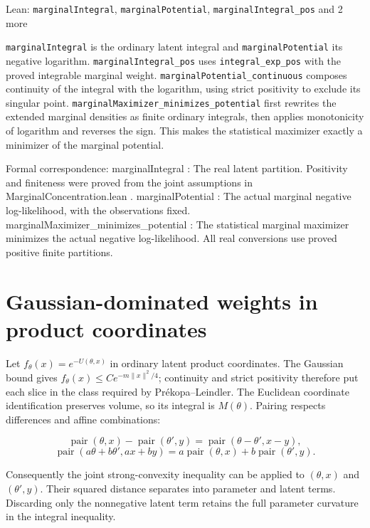 \documentclass[11pt,a4paper]{article}
\newlength{\leancharwidth}
\newenvironment{leancode}{\par\smallskip\begingroup\ttfamily\footnotesize\raggedright
  \settowidth{\leancharwidth}{M}\setlength{\parskip}{0pt}\setlength{\parindent}{0pt}
  \frenchspacing}{\par\endgroup\smallskip}
\newcommand{\leanlabel}[1]{\par\smallskip\noindent{\small\bfseries #1}\par}
\begin{document}
\begin{leanbox}{Lean: \texttt{marginalIntegral}, \texttt{marginalPotential}, \texttt{marginalIntegral\_\allowbreak{}pos} and 2 more}
\begin{leancode}
\end{leancode}
\leanlabel{How the Lean proof follows the argument}
\texttt{marginal\allowbreak{}Integral} is the ordinary latent integral and \texttt{marginal\allowbreak{}Potential} its negative logarithm. \texttt{marginal\allowbreak{}Integral\_\allowbreak{}pos} uses \texttt{integral\_\allowbreak{}exp\_\allowbreak{}pos} with the proved integrable marginal weight. \texttt{marginal\allowbreak{}Potential\_\allowbreak{}continuous} composes continuity of the integral with the logarithm, using strict positivity to exclude its singular point. \texttt{marginal\allowbreak{}Maximizer\_\allowbreak{}minimizes\_\allowbreak{}potential} first rewrites the extended marginal densities as finite ordinary integrals, then applies monotonicity of logarithm and reverses the sign. This makes the statistical maximizer exactly a minimizer of the marginal potential.



Formal correspondence: marginalIntegral : The real latent partition. Positivity and finiteness were proved from the joint assumptions in MarginalConcentration.lean . marginalPotential : The actual marginal negative log-likelihood, with the observations fixed. marginalMaximizer\_minimizes\_potential : The statistical marginal maximizer minimizes the actual negative log-likelihood. All real conversions use proved positive finite partitions.
\end{leanbox}

\section{\texorpdfstring{Gaussian-dominated weights in product coordinates}{Gaussian-dominated weights in product coordinates}}


Let \(f_\theta(x)=e^{-U(\theta,x)}\) in ordinary latent product coordinates. The Gaussian bound gives \(f_\theta(x)\le Ce^{-m\|x\|^2/4}\); continuity and strict positivity therefore put each slice in the class required by Prékopa–Leindler. The Euclidean coordinate identification preserves volume, so its integral is \(M(\theta)\). Pairing respects differences and affine combinations:

\[\operatorname{pair}(\theta,x)-\operatorname{pair}(\theta',y)=\operatorname{pair}(\theta-\theta',x-y),\]\[\operatorname{pair}(a\theta+b\theta',ax+by)=a\operatorname{pair}(\theta,x)+b\operatorname{pair}(\theta',y).\]

Consequently the joint strong-convexity inequality can be applied to \((\theta,x)\) and \((\theta',y)\). Their squared distance separates into parameter and latent terms. Discarding only the nonnegative latent term retains the full parameter curvature in the integral inequality.
\end{document}
